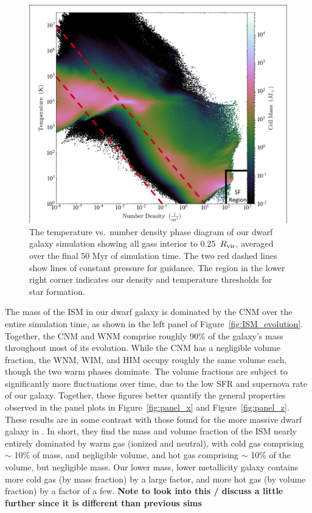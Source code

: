 \documentclass[twocolumn]{aastex61}
\begin{document}
\begin{figure}
\centering
\includegraphics[width=0.95\linewidth]{phase_diagram.png}
\caption{The temperature vs.\ number density phase diagram of our dwarf galaxy simulation showing all gass interior to 0.25~$R_{\rm vir}$, averaged over the final 50 Myr of simulation time. The two red dashed lines show lines of constant pressure for guidance. The region in the lower right corner indicates our density and temperature thresholds for star formation.}
\label{fig:phase}
\end{figure} 

The mass of the ISM in our dwarf galaxy is dominated by the CNM over the entire simulation time, as shown in the left panel of Figure~\ref{fig:ISM_evolution}. Together, the CNM and WNM comprise roughly 90\% of the galaxy's mass throughout most of its evolution. While the CNM has a negligible volume fraction, the WNM, WIM, and HIM occupy roughly the same volume each, though the two warm phases dominate. The volume fractions are subject to significantly more fluctuations over time, due to the low SFR and supernova rate of our galaxy. Together, these figures better quantify the general properties observed in the panel plots in Figure~\ref{fig:panel_x} and Figure~\ref{fig:panel_z}. These results are in some contrast with those found for the more massive dwarf galaxy in \citet{Hu2016,Hu2017}. In short, they find the mass and volume fraction of the ISM nearly entirely dominated by warm gas (ionized and neutral), with cold gas comprising $\sim$ 10\% of mass, and negligible volume, and hot gas comprising $\sim$ 10\% of the volume, but negligible mass. Our lower mass, lower metallicity galaxy contains more cold gas (by mass fraction) by a large factor, and more hot gas (by volume fraction) by a factor of a few. \textbf{Note to look into this / discuss a little further since it is different than previous sims}
\end{document}
